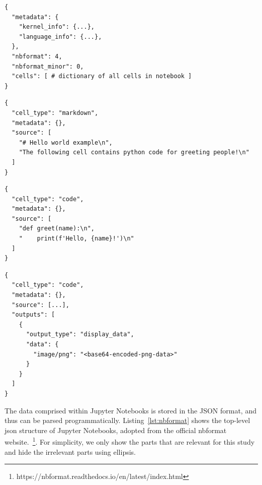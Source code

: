 \documentclass[conference]{IEEEtran}
\begin{document}
\begin{minipage}{0.45\textwidth}
  \begin{lstlisting}
{
  "metadata": {
    "kernel_info": {...},
    "language_info": {...},
  },
  "nbformat": 4,
  "nbformat_minor": 0,
  "cells": [ # dictionary of all cells in notebook ]
}
  \end{lstlisting}
  \label{lst:nbformat}
\end{minipage}
\hfill
\begin{minipage}{0.45\textwidth}
  \begin{lstlisting}
{
  "cell_type": "markdown",
  "metadata": {},
  "source": [
    "# Hello world example\n",
    "The following cell contains python code for greeting people!\n"
  ]
}
  \end{lstlisting}
  \label{lst:cell-md}
\end{minipage}
\begin{minipage}{0.45\textwidth}
  \begin{lstlisting}
{
  "cell_type": "code",
  "metadata": {},
  "source": [
    "def greet(name):\n",
    "    print(f'Hello, {name}!')\n"
  ]
}
  \end{lstlisting}
  \label{lst:cell-code}
\end{minipage}
\hfill
\begin{minipage}{0.45\textwidth}
  \begin{lstlisting}
{
  "cell_type": "code",
  "metadata": {},
  "source": [...],
  "outputs": [
    {
      "output_type": "display_data",
      "data": {
        "image/png": "<base64-encoded-png-data>"
      }
    }
  ]
}
  \end{lstlisting}
  \label{lst:cell-output}
\end{minipage}

The data comprised within Jupyter Notebooks is stored in the JSON
format, and thus can be parsed
programmatically. Listing~\ref{lst:nbformat} shows the top-level json
structure of Jupyter Notebooks, adopted from the official nbformat
website.~\footnote{https://nbformat.readthedocs.io/en/latest/index.html}. For
simplicity, we only show the parts that are relevant for this study
and hide the irrelevant parts using ellipsis.
\end{document}
